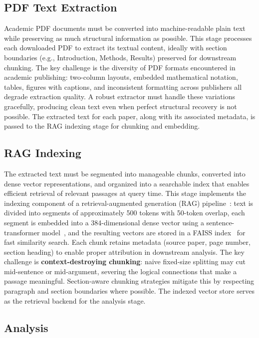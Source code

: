 \documentclass[12pt,a4paper]{article}
\begin{document}
\subsection{PDF Text Extraction}

Academic PDF documents must be converted into machine-readable plain text while preserving as much structural information as possible. This stage processes each downloaded PDF to extract its textual content, ideally with section boundaries (e.g., Introduction, Methods, Results) preserved for downstream chunking. The key challenge is the diversity of PDF formats encountered in academic publishing: two-column layouts, embedded mathematical notation, tables, figures with captions, and inconsistent formatting across publishers all degrade extraction quality. A robust extractor must handle these variations gracefully, producing clean text even when perfect structural recovery is not possible. The extracted text for each paper, along with its associated metadata, is passed to the RAG indexing stage for chunking and embedding.

\subsection{RAG Indexing}

The extracted text must be segmented into manageable chunks, converted into dense vector representations, and organized into a searchable index that enables efficient retrieval of relevant passages at query time. This stage implements the indexing component of a retrieval-augmented generation (RAG) pipeline~\citep{lewis2020rag}: text is divided into segments of approximately 500 tokens with 50-token overlap, each segment is embedded into a 384-dimensional dense vector using a sentence-transformer model~\citep{reimers2019sbert}, and the resulting vectors are stored in a FAISS index~\citep{johnson2019faiss} for fast similarity search. Each chunk retains metadata (source paper, page number, section heading) to enable proper attribution in downstream analysis. The key challenge is \textbf{context-destroying chunking}: naive fixed-size splitting may cut mid-sentence or mid-argument, severing the logical connections that make a passage meaningful. Section-aware chunking strategies mitigate this by respecting paragraph and section boundaries where possible. The indexed vector store serves as the retrieval backend for the analysis stage.

\subsection{Analysis}
\end{document}
